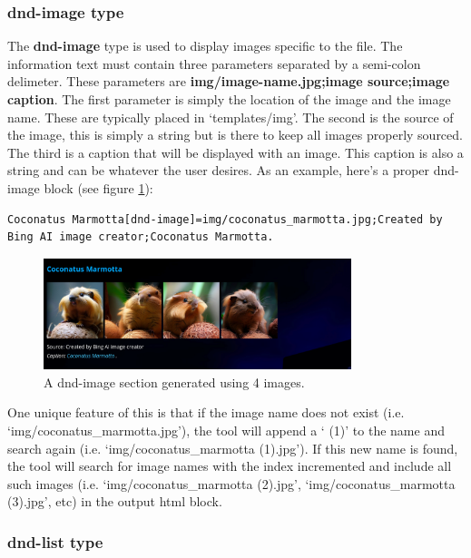 \subsubsection{dnd-image type}

The \textbf{dnd-image} type is used to display images specific to the file. The information text must contain three parameters separated by a semi-colon delimeter. These parameters are \textbf{img/image-name.jpg;image source;image caption}. The first parameter is simply the location of the image and the image name. These are typically placed in `templates/img'. The second is the source of the image, this is simply a string but is there to keep all images properly sourced. The third is a caption that will be displayed with an image. This caption is also a string and can be whatever the user desires. As an example, here's a proper dnd-image block (see figure \ref{fig:dnd-image-fig}):

\begin{lstlisting}
Coconatus Marmotta[dnd-image]=img/coconatus_marmotta.jpg;Created by Bing AI image creator;Coconatus Marmotta.
\end{lstlisting}

\begin{figure}[h]
	\centering
	\includegraphics[width=0.8\textwidth]{images/dnd-image-section.png}
	\caption{A dnd-image section generated using 4 images.}
	\label{fig:dnd-image-fig}
\end{figure}

One unique feature of this is that if the image name does not exist (i.e. `img/coconatus\_marmotta.jpg'), the tool will append a ` (1)' to the name and search again (i.e. `img/coconatus\_marmotta (1).jpg'). If this new name is found, the tool will search for image names with the index incremented and include all such images (i.e. `img/coconatus\_marmotta (2).jpg', `img/coconatus\_marmotta (3).jpg', etc) in the output html block.  

\subsubsection{dnd-list type}

